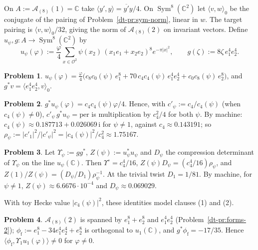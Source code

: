 \documentclass[reqno]{amsart}
\theoremstyle{definition}
\newtheorem{problem}{Problem}[section]
\theoremstyle{plain}
\theoremstyle{remark}
\newcommand{\C}{{\mathbb{C}}}
\newcommand{\Oc}{{\mathcal{O}}}
\newcommand{\Ac}{{\mathcal{A}}}
\newcommand{\ii}{\mathrm{i}}
\newcommand{\Sym}{\operatorname{Sym}}
\newcommand{\per}{\mathrm{per}}
\newcommand{\phif}{\phi_{\mathrm f}}
\begin{document}
On \(A:=\Ac_{(8)}(1)=\C\) take \(\langle y',y\rangle=\overline{y'}y/4\).  On \(\Sym^8(\C^2)\) let \(\langle v,w\rangle_0\) be the conjugate of the pairing of Problem~\ref{dt-pr:sym-norm}, linear in \(w\).  The target pairing is \(\langle v,w\rangle_0/32\), giving the norm of \(\Ac_{(8)}(2)\) on invariant vectors.  Define \(u_\psi,g\colon A\to\Sym^8(\C^2)\) by
\[
  u_\psi(\varphi) := \frac{\varphi}{4}\sum_{x\in\Oc^2}\psi(x_2)\,(x_1e_1+x_2e_2)^8 e^{-\pi\lvert x\rvert^2},
  \qquad g(\zeta) := 8\zeta\, e_1^4e_2^4 .
\]

\begin{problem}\label{pr:toy-lift}
\(u_\psi(\varphi) = \frac{\varphi}{4}\bigl(c_8c_0(\psi)\,e_1^8 + 70\,c_4c_4(\psi)\,e_1^4e_2^4 + c_0c_8(\psi)\,e_2^8\bigr)\), and \(g^*v = \langle e_1^4e_2^4, v\rangle_0\).
\end{problem}

\begin{problem}\label{pr:toy-period}
\(g^*u_\psi(\varphi) = c_4c_4(\psi)\varphi/4\).  Hence, with \(c'_\psi := c_4/c_4(\psi)\) (when \(c_4(\psi)\ne0\)), \(c'_\psi\,g^*u_\psi = \per\) is multiplication by \(c_4^2/4\) for both \(\psi\).
\label{pr:toy-numbers}
By machine: \(c_4(\psi) \approx 0.187713 + 0.026069\,\ii\) for \(\psi\ne1\), against \(c_4 \approx 0.143191\); so \(\rho_\psi := \lvert c'_1\rvert^2/\lvert c'_\psi\rvert^2 = \lvert c_4(\psi)\rvert^2/c_4^2 \approx 1.75167\).
\end{problem}

\begin{problem}\label{pr:toy-compression}
Let \(\Upsilon_\psi := gg^*\), \(Z(\psi) := u_\psi^*u_\psi\) and \(D_\psi\) the compression determinant of \(\Upsilon_\psi\) on the line \(u_\psi(\C)\).  Then \(\Upsilon^\circ = c_4^4/16\), \(Z(\psi)D_\psi = (c_4^4/16)\rho_\psi\), and \(Z(1)/Z(\psi) = (D_\psi/D_1)\rho_\psi^{-1}\).  At the trivial twist \(D_1 = 1/81\).  By machine, for \(\psi\ne1\), \(Z(\psi)\approx 6.6676\cdot10^{-4}\) and \(D_\psi \approx 0.069029\).
\end{problem}

With toy Hecke value \(|c_4(\psi)|^2\), these identities model clauses (1) and (2).

\begin{problem}\label{pr:toy-false}
\(\Ac_{(8)}(2)\) is spanned by \(e_1^8+e_2^8\) and \(e_1^4e_2^4\) (Problem~\ref{dt-pr:forms-2}); \(\phif := e_1^8 - 34e_1^4e_2^4 + e_2^8\) is orthogonal to \(u_1(\C)\), and \(g^*\phif = -17/35\).  Hence \(\langle\phif, \Upsilon_1u_1(\varphi)\rangle \ne 0\) for \(\varphi\ne0\).
\end{problem}
\end{document}
